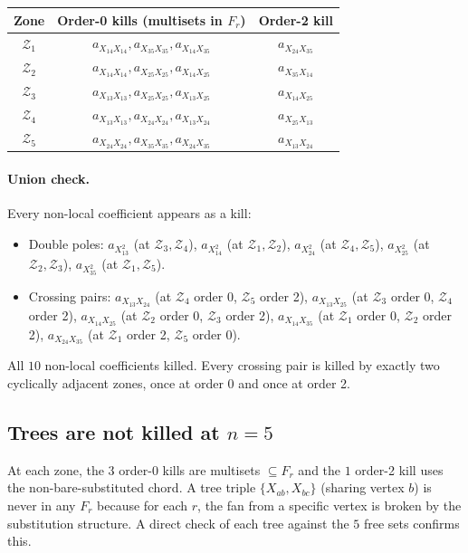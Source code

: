 \documentclass[11pt]{article}
\newcommand{\X}[2]{X_{#1#2}}
\newcommand{\Z}{\mathcal{Z}}
\theoremstyle{definition}
\begin{document}
\begin{center}
\begin{tabular}{c|c|c}
\toprule
Zone & Order-0 kills (multisets in $F_r$) & Order-2 kill \\
\midrule
$\Z_1$ & $a_{\X{1}{4}\X{1}{4}}, a_{\X{3}{5}\X{3}{5}}, a_{\X{1}{4}\X{3}{5}}$ & $a_{\X{2}{4}\X{3}{5}}$\\
$\Z_2$ & $a_{\X{1}{4}\X{1}{4}}, a_{\X{2}{5}\X{2}{5}}, a_{\X{1}{4}\X{2}{5}}$ & $a_{\X{3}{5}\X{1}{4}}$\\
$\Z_3$ & $a_{\X{1}{3}\X{1}{3}}, a_{\X{2}{5}\X{2}{5}}, a_{\X{1}{3}\X{2}{5}}$ & $a_{\X{1}{4}\X{2}{5}}$\\
$\Z_4$ & $a_{\X{1}{3}\X{1}{3}}, a_{\X{2}{4}\X{2}{4}}, a_{\X{1}{3}\X{2}{4}}$ & $a_{\X{2}{5}\X{1}{3}}$\\
$\Z_5$ & $a_{\X{2}{4}\X{2}{4}}, a_{\X{3}{5}\X{3}{5}}, a_{\X{2}{4}\X{3}{5}}$ & $a_{\X{1}{3}\X{2}{4}}$\\
\bottomrule
\end{tabular}
\end{center}

\paragraph{Union check.} Every non-local coefficient appears as a kill:
\begin{itemize}[nosep,leftmargin=2em]
\item Double poles: $a_{\X{1}{3}^2}$ (at $\Z_3, \Z_4$), $a_{\X{1}{4}^2}$ (at
$\Z_1, \Z_2$), $a_{\X{2}{4}^2}$ (at $\Z_4, \Z_5$), $a_{\X{2}{5}^2}$ (at $\Z_2,
\Z_3$), $a_{\X{3}{5}^2}$ (at $\Z_1, \Z_5$).
\item Crossing pairs: $a_{\X{1}{3}\X{2}{4}}$ (at $\Z_4$ order 0, $\Z_5$ order 2),
$a_{\X{1}{3}\X{2}{5}}$ (at $\Z_3$ order 0, $\Z_4$ order 2),
$a_{\X{1}{4}\X{2}{5}}$ (at $\Z_2$ order 0, $\Z_3$ order 2),
$a_{\X{1}{4}\X{3}{5}}$ (at $\Z_1$ order 0, $\Z_2$ order 2),
$a_{\X{2}{4}\X{3}{5}}$ (at $\Z_1$ order 2, $\Z_5$ order 0).
\end{itemize}
All $10$ non-local coefficients killed. Every crossing pair is killed by
exactly two cyclically adjacent zones, once at order 0 and once at order 2.

\subsection{Trees are not killed at \texorpdfstring{$n=5$}{n=5}}

At each zone, the $3$ order-0 kills are multisets $\subseteq F_r$ and the
$1$ order-2 kill uses the non-bare-substituted chord. A tree triple
$\{\X{a}{b}, \X{b}{c}\}$ (sharing vertex $b$) is never in any $F_r$ because
for each $r$, the fan from a specific vertex is broken by the substitution
structure. A direct check of each tree against the $5$ free sets confirms this.
\end{document}
